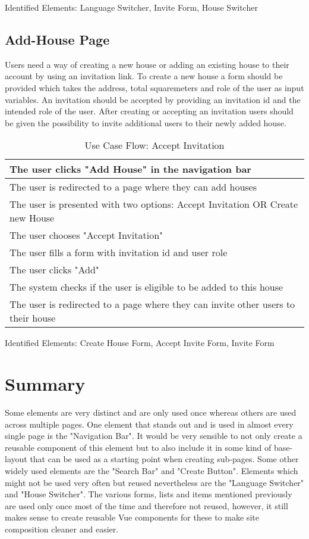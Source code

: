 Identified Elements: Language Switcher, Invite Form, House Switcher

\subsection{Add-House Page}
Users need a way of creating a new house or adding an existing house to their account by using an invitation link. To create a new house a form should be provided which takes the address, total squaremeters and role of the user as input variables. An invitation should be accepted by providing an invitation id and the intended role of the user. After creating or accepting an invitation users should be given the possibility to invite additional users to their newly added house. \newline

\begin{table}[H]
\begin{tabularx}{\linewidth}{|X|}
  \hline
   The user clicks "Add House" in the navigation bar \\
   \hline
   The user is redirected to a page where they can add houses \\
   \hline
   The user is presented with two options: Accept Invitation OR Create new House \\
   \hline 
   The user chooses "Accept Invitation" \\
   \hline 
   The user fills a form with invitation id and user role \\
   \hline
   The user clicks "Add" \\
   \hline  
   The system checks if the user is eligible to be added to this house \\
   \hline  
   The user is redirected to a page where they can invite other users to their house \\
   \hline  
\end{tabularx}
\caption{Use Case Flow: Accept Invitation}
\end{table}

Identified Elements: Create House Form, Accept Invite Form, Invite Form

\section{Summary} \label{sec:uisummary}
Some elements are very distinct and are only used once whereas others are used across multiple pages. One element that stands out and is used in almost every single page is the "Navigation Bar". It would be very sensible to not only create a reusable component of this element but to also include it in some kind of base-layout that can be used as a starting point when creating sub-pages. Some other widely used elements are the "Search Bar" and "Create Button". Elements which might not be used very often but reused nevertheless are the "Language Switcher" and "House Switcher". The various forms, lists and items mentioned previously are used only once most of the time and therefore not reused, however, it still makes sense to create reusable Vue components for these to make site composition cleaner and easier.

